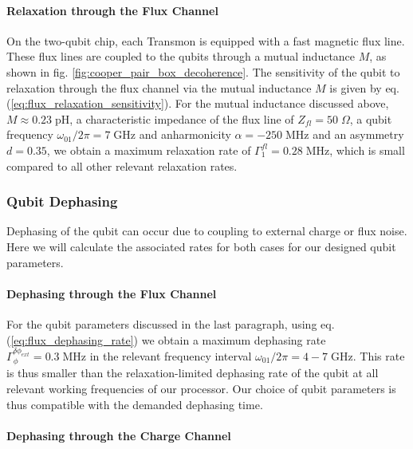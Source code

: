 \paragraph{Relaxation through the Flux Channel} \label{section:relaxation_through_charge}

On the two-qubit chip, each Transmon is equipped with a fast magnetic flux line. These flux lines are coupled to the qubits through a mutual inductance $M$, as shown in fig. \ref{fig:cooper_pair_box_decoherence}. The sensitivity of the qubit to relaxation through the flux channel via the mutual inductance $M$ is given by eq. (\ref{eq:flux_relaxation_sensitivity}). For the mutual inductance discussed above, $M \approx 0.23\;\mathrm{pH}$, a characteristic impedance of the flux line of $Z_{fl}=50\;\Omega$, a qubit frequency $\omega_{01}/2\pi= 7 \;\mathrm{GHz}$ and anharmonicity $\alpha=-250\;\mathrm{MHz}$ and an asymmetry $d=0.35$, we obtain a maximum relaxation rate of $\Gamma_1^{fl}=0.28\;\mathrm{MHz}$, which is small compared to all other relevant relaxation rates. 

\subsubsection{Qubit Dephasing}

Dephasing of the qubit can occur due to coupling to external charge or flux noise. Here we will calculate the associated rates for both cases for our designed qubit parameters.

\paragraph{Dephasing through the Flux Channel}

For the qubit parameters discussed in the last paragraph, using eq. (\ref{eq:flux_dephasing_rate}) we obtain a maximum dephasing rate $\Gamma_\phi^{\delta \phi_{ext}}= 0.3\;\mathrm{MHz}$ in the relevant frequency interval $\omega_{01}/2\pi = 4-7 \; \mathrm{GHz}$. This rate is thus smaller than the relaxation-limited dephasing rate of the qubit at all relevant working frequencies of our processor. Our choice of qubit parameters is thus compatible with the demanded dephasing time.

\paragraph{Dephasing through the Charge Channel}

